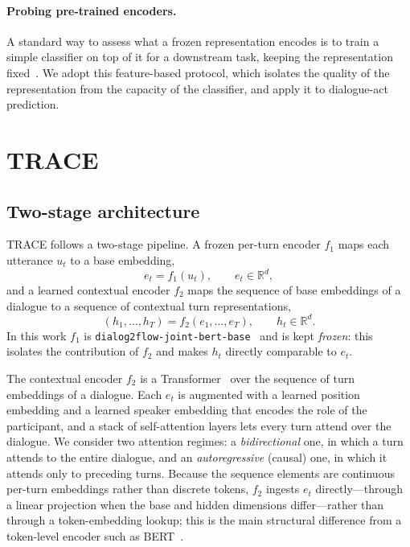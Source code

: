 \documentclass[11pt]{article}
\begin{document}
\paragraph{Probing pre-trained encoders.}
A standard way to assess what a frozen representation encodes is to train a simple classifier on top
of it for a downstream task, keeping the representation
fixed~\cite{devlin2019bert}. We adopt this feature-based protocol, which isolates the quality of the
representation from the capacity of the classifier, and apply it to dialogue-act prediction.

\section{TRACE}
\label{sec:method}

\subsection{Two-stage architecture}
TRACE follows a two-stage pipeline. A frozen per-turn encoder $f_1$ maps each utterance $u_t$ to a
base embedding,
\begin{equation}
  e_t = f_1(u_t), \qquad e_t \in \mathbb{R}^d,
\end{equation}
and a learned contextual encoder $f_2$ maps the sequence of base embeddings of a dialogue to a
sequence of contextual turn representations,
\begin{equation}
  (h_1,\dots,h_T) = f_2(e_1,\dots,e_T), \qquad h_t \in \mathbb{R}^d.
\end{equation}
In this work $f_1$ is \texttt{dialog2flow-joint-bert-base}~\cite{burdisso2024dialog2flow} and is kept
\emph{frozen}: this isolates the contribution of $f_2$ and makes $h_t$ directly comparable to $e_t$.

The contextual encoder $f_2$ is a Transformer~\cite{vaswani2017attention} over the sequence of turn
embeddings of a dialogue. Each $e_t$ is augmented with a learned position embedding and a learned
speaker embedding that encodes the role of the participant, and a stack of self-attention layers lets
every turn attend over the dialogue. We consider two attention regimes: a \emph{bidirectional} one, in
which a turn attends to the entire dialogue, and an \emph{autoregressive} (causal) one, in which it
attends only to preceding turns. Because the sequence elements are continuous per-turn embeddings
rather than discrete tokens, $f_2$ ingests $e_t$ directly---through a linear projection when the base
and hidden dimensions differ---rather than through a token-embedding lookup; this is the main
structural difference from a token-level encoder such as BERT~\cite{devlin2019bert}.
\end{document}
